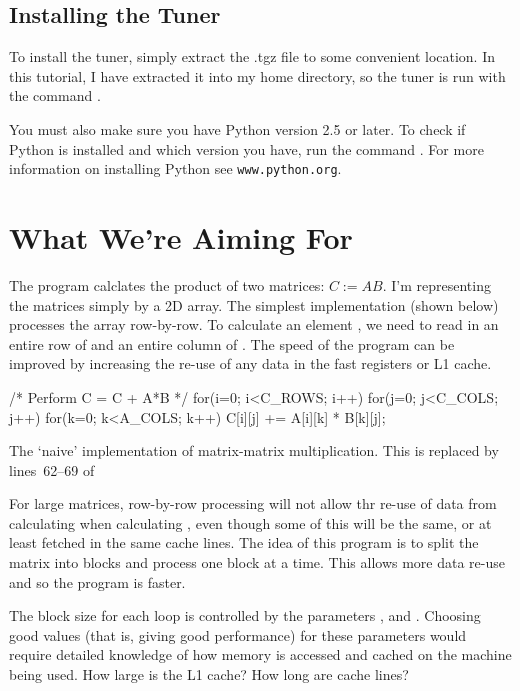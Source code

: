 \documentclass[a4paper]{article}
\begin{document}
\subsection{Installing the Tuner}
To install the tuner, simply extract the .tgz file to some convenient location. 
In this tutorial, I have extracted it into my home directory, so the tuner is 
run with the command .

You must also make sure you have Python version 2.5 or later. To check if 
Python is installed and which version you have, run the command 
. For more information on installing Python 
see \texttt{www.python.org}.




\clearpage

\section{What We're Aiming For}
The program calclates the product of two matrices: $C := AB$. I'm representing 
the matrices simply by a 2D array. The simplest implementation (shown below) 
processes the array  row-by-row. 
To calculate an element , we need to read in an entire row of 
 and an entire column of . The speed of the program can be 
improved by increasing the re-use of any data in the fast registers or L1 
cache. 

\begin{listing}[h]
\begin{Code}
/* Perform C = C + A*B */
for(i=0; i<C_ROWS; i++)
    for(j=0; j<C_COLS; j++)
        for(k=0; k<A_COLS; k++)
            C[i][j] += A[i][k] * B[k][j];
\end{Code}

\caption{The `naive' implementation of matrix-matrix multiplication. 
This is replaced by lines~62--69 of }
\label{code:matrix-naive}
\end{listing}

For large matrices, row-by-row processing will not allow thr re-use of 
data from calculating  when calculating , even 
though some of this will be the same, or at least fetched in the same cache 
lines. The idea of this program is to split the matrix into blocks and process 
one block at a time. This allows more data re-use and so the program is faster.

The block size for each loop is controlled by the parameters , 
 and .
Choosing good values (that is, giving good performance) for these parameters 
would require detailed knowledge of how memory is accessed and cached on the 
machine being used. How large is the L1 cache? How long are cache lines? 
\end{document}
